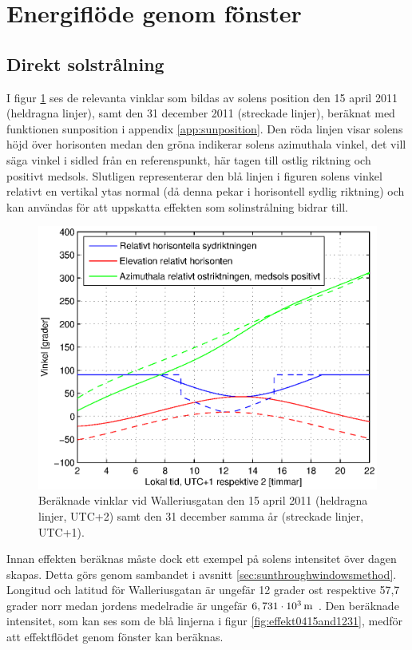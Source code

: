 \section{Energiflöde genom fönster}

\subsection{Direkt solstrålning}
I figur \ref{fig:sun0415and1231} ses de relevanta vinklar som bildas av solens position den 15 april 2011 (heldragna linjer), samt den 31 december 2011 (streckade linjer), beräknat med funktionen sunposition i appendix \ref{app:sunposition}. Den röda linjen visar solens höjd över horisonten medan den gröna indikerar solens azimuthala vinkel, det vill säga vinkel i sidled från en referenspunkt, här tagen till ostlig riktning och positivt medsols. Slutligen representerar den blå linjen i figuren solens vinkel relativt en vertikal ytas normal (då denna pekar i horisontell sydlig riktning) och kan användas för att uppskatta effekten som solinstrålning bidrar till.

\begin{figure}[hpbt]
\centering
\includegraphics[scale=0.7]{images/sun0415and1231.eps}
\caption{\label{fig:sun0415and1231} Beräknade vinklar vid Walleriusgatan den 15 april 2011 (heldragna linjer, UTC+2) samt den 31 december samma år (streckade linjer, UTC+1).}
\end{figure}

Innan effekten beräknas måste dock ett exempel på solens intensitet över dagen skapas. Detta görs genom sambandet i avsnitt \ref{sec:sunthroughwindowsmethod}. Longitud och latitud för Walleriusgatan är ungefär 12 grader ost respektive 57,7 grader norr medan jordens medelradie är ungefär $\unit[6,731\cdot 10^{3}]{m}$ \cite{physicshandbook}. Den beräknade intensitet, som kan ses som de blå linjerna i figur \ref{fig:effekt0415and1231}, medför att effektflödet genom fönster kan beräknas.

